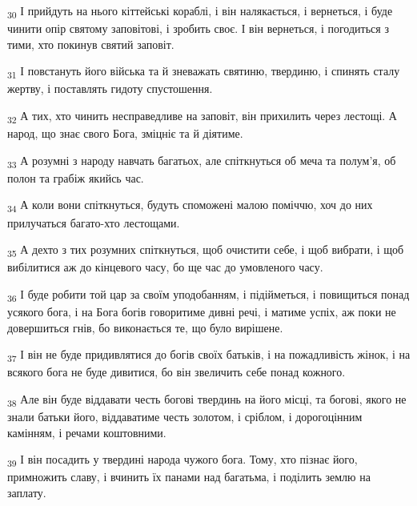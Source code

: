 \begin{tcolorbox}
\textsubscript{30} І прийдуть на нього кіттейські кораблі, і він налякається, і вернеться, і буде чинити опір святому заповітові, і зробить своє. І він вернеться, і погодиться з тими, хто покинув святий заповіт.
\end{tcolorbox}
\begin{tcolorbox}
\textsubscript{31} І повстануть його війська та й зневажать святиню, твердиню, і спинять сталу жертву, і поставлять гидоту спустошення.
\end{tcolorbox}
\begin{tcolorbox}
\textsubscript{32} А тих, хто чинить несправедливе на заповіт, він прихилить через лестощі. А народ, що знає свого Бога, зміцніє та й діятиме.
\end{tcolorbox}
\begin{tcolorbox}
\textsubscript{33} А розумні з народу навчать багатьох, але спіткнуться об меча та полум'я, об полон та грабіж якийсь час.
\end{tcolorbox}
\begin{tcolorbox}
\textsubscript{34} А коли вони спіткнуться, будуть споможені малою поміччю, хоч до них прилучаться багато-хто лестощами.
\end{tcolorbox}
\begin{tcolorbox}
\textsubscript{35} А дехто з тих розумних спіткнуться, щоб очистити себе, і щоб вибрати, і щоб вибілитися аж до кінцевого часу, бо ще час до умовленого часу.
\end{tcolorbox}
\begin{tcolorbox}
\textsubscript{36} І буде робити той цар за своїм уподобанням, і підійметься, і повищиться понад усякого бога, і на Бога богів говоритиме дивні речі, і матиме успіх, аж поки не довершиться гнів, бо виконається те, що було вирішене.
\end{tcolorbox}
\begin{tcolorbox}
\textsubscript{37} І він не буде придивлятися до богів своїх батьків, і на пожадливість жінок, і на всякого бога не буде дивитися, бо він звеличить себе понад кожного.
\end{tcolorbox}
\begin{tcolorbox}
\textsubscript{38} Але він буде віддавати честь богові твердинь на його місці, та богові, якого не знали батьки його, віддаватиме честь золотом, і сріблом, і дорогоцінним камінням, і речами коштовними.
\end{tcolorbox}
\begin{tcolorbox}
\textsubscript{39} І він посадить у твердині народа чужого бога. Тому, хто пізнає його, примножить славу, і вчинить їх панами над багатьма, і поділить землю на заплату.
\end{tcolorbox}
